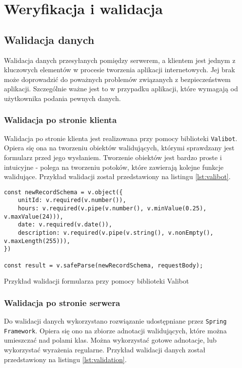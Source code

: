 \chapter{Weryfikacja i walidacja}
\label{ch:06}

\section{Walidacja danych}

Walidacja danych przesyłanych pomiędzy serwerem, a klientem jest jednym z kluczowych elementów w procesie tworzenia aplikacji internetowych. Jej brak może doprowadzić do poważnych problemów związanych z bezpieczeństwem aplikacji. Szczególnie ważne jest to w przypadku aplikacji, które wymagają od użytkownika podania pewnych danych.

\subsection{Walidacja po stronie klienta}

Walidacja po stronie klienta jest realizowana przy pomocy biblioteki \texttt{Valibot}. Opiera się ona na tworzeniu obiektów walidujących, którymi sprawdzany jest formularz przed jego wysłaniem. Tworzenie obiektów jest bardzo proste i intuicyjne - polega na tworzeniu potoków, które zawierają kolejne funkcje walidujące. Przykład walidacji został przedstawiony na listingu \ref{lst:valibot}.

\begin{listing}
    \begin{verbatim}
const newRecordSchema = v.object({
    unitId: v.required(v.number()),
    hours: v.required(v.pipe(v.number(), v.minValue(0.25), v.maxValue(24))),
    date: v.required(v.date()),
    description: v.required(v.pipe(v.string(), v.nonEmpty(), v.maxLength(255))),
})

const result = v.safeParse(newRecordSchema, requestBody);
    \end{verbatim}
    \caption{Przykład walidacji formularza przy pomocy biblioteki Valibot}
    \label{lst:valibot}
\end{listing}

\subsection{Walidacja po stronie serwera}

Do walidacji danych wykorzystano rozwiązanie udostępniane przez \texttt{Spring Framework}. Opiera się ono na zbiorze adnotacji walidujących, które można umieszczać nad polami klas. Można wykorzystać gotowe adnotacje, lub wykorzystać wyrażenia regularne. Przykład walidacji danych został przedstawiony na listingu \ref{lst:validation}.

